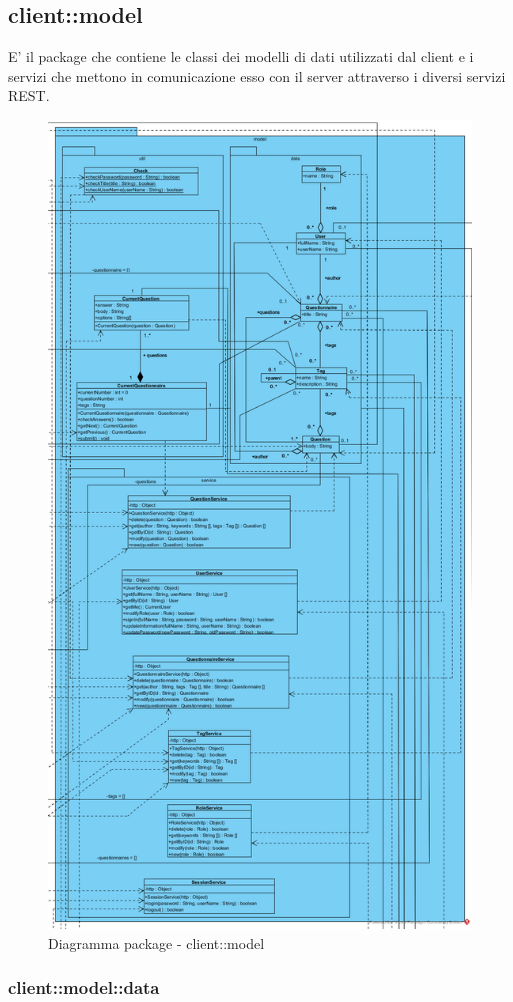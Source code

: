 \subsection{client::model}
E' il package che contiene le classi dei modelli di dati utilizzati
dal client e i servizi che mettono in comunicazione esso con il server
attraverso i diversi servizi REST.\begin{center}
		\begin{figure}[H]
			\centering \includegraphics[scale=4, max width=\textwidth, max height=\myheight]{../img/diagrammiClassi/client/model.png}
			\caption{Diagramma package - client::model}
		\end{figure}
	\end{center}\subsubsection{client::model::data}
